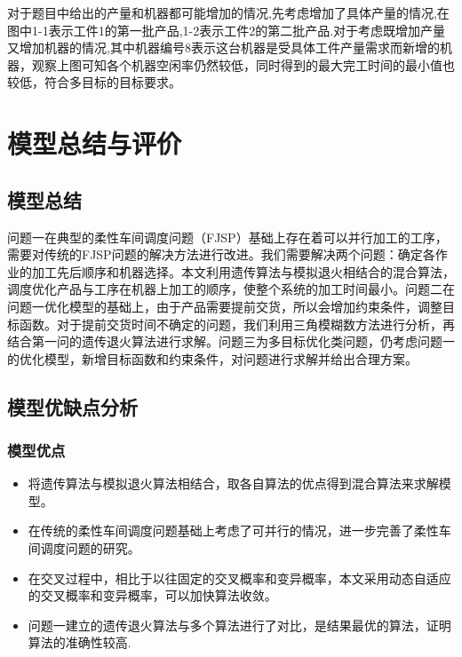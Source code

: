\documentclass{whutmod}
\begin{document}
\begin{spacing}{1.2}
    对于题目中给出的产量和机器都可能增加的情况,先考虑增加了具体产量的情况,在图中1-1表示工件1的第一批产品,1-2表示工件2的第二批产品.对于考虑既增加产量又增加机器的情况,其中机器编号8表示这台机器是受具体工件产量需求而新增的机器，观察上图可知各个机器空闲率仍然较低，同时得到的最大完工时间的最小值也较低，符合多目标的目标要求。
     
   
  
    
	\section{模型总结与评价}        
        
    
	\subsection{模型总结}
    
    问题一在典型的柔性车间调度问题（FJSP）基础上存在着可以并行加工的工序，需要对传统的FJSP问题的解决方法进行改进。我们需要解决两个问题：确定各作业的加工先后顺序和机器选择。本文利用遗传算法与模拟退火相结合的混合算法，调度优化产品与工序在机器上加工的顺序，使整个系统的加工时间最小。问题二在问题一优化模型的基础上，由于产品需要提前交货，所以会增加约束条件，调整目标函数。对于提前交货时间不确定的问题，我们利用三角模糊数方法进行分析，再结合第一问的遗传退火算法进行求解。问题三为多目标优化类问题，仍考虑问题一的优化模型，新增目标函数和约束条件，对问题进行求解并给出合理方案。
    
	\subsection{模型优缺点分析}
	\subsubsection{模型优点}
	\begin{itemize}
	 \item 将遗传算法与模拟退火算法相结合，取各自算法的优点得到混合算法来求解模型。

  \item 在传统的柔性车间调度问题基础上考虑了可并行的情况，进一步完善了柔性车间调度问题的研究。

    \item 在交叉过程中，相比于以往固定的交叉概率和变异概率，本文采用动态自适应的交叉概率和变异概率，可以加快算法收敛。
    
    \item 问题一建立的遗传退火算法与多个算法进行了对比，是结果最优的算法，证明算法的准确性较高.
	\end{itemize}

\end{spacing}
\end{document}
